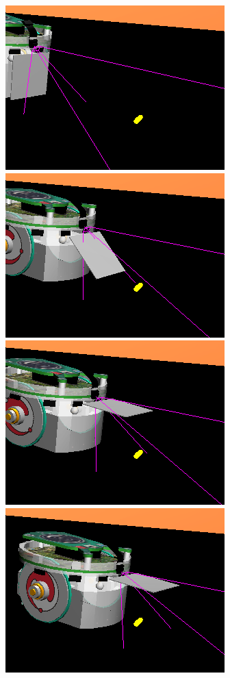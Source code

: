 \begin{figure}[htp]
\begin{center}
\includegraphics[scale=0.25]{comportamientos/figures/collect1.png}
\includegraphics[scale=0.25]{comportamientos/figures/collect2.png}
\includegraphics[scale=0.25]{comportamientos/figures/collect3.png}
\includegraphics[scale=0.25]{comportamientos/figures/collect4.png}

\end{center}
\end{figure}
